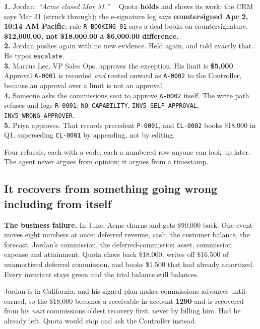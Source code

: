 \documentclass[10pt,a4paper]{article}
\newcommand{\gy}[1]{{\color{qgrey}#1}}
\newcommand{\code}[1]{{\small\texttt{#1}}}
\begin{document}
\begin{callout}
\small
\textbf{1.} Jordan: \emph{``Acme closed Mar 31.''} \ \ Quota \textbf{holds} and shows its work: the CRM says Mar 31 \gy{(struck through)}; the e-signature log says \textbf{countersigned Apr 2, 10:14 AM Pacific}; rule \code{R-BOOKING-01} says a deal books on countersignature. \textbf{\$12{,}000.00, not \$18{,}000.00 \textemdash{} a \$6{,}000.00 difference.}\\[4pt]
\textbf{2.} Jordan pushes again with no new evidence. Held again, and told exactly that. He types \code{escalate}.\\[4pt]
\textbf{3.} Marcus Lee, VP Sales Ops, approves the exception. His limit is \textbf{\$5{,}000}. Approval \code{A-0001} is recorded \emph{and} routed onward as \code{A-0002} to the Controller, because an approval over a limit is not an approval.\\[4pt]
\textbf{4.} Someone asks the commissions seat to approve \code{A-0002} itself. The write path refuses and logs \code{R-0001}: \code{NO\_CAPABILITY}, \code{INV5\_SELF\_APPROVAL}, \code{INV5\_WRONG\_APPROVER}.\\[4pt]
\textbf{5.} Priya approves. That records precedent \code{P-0001}, and \code{CL-0002} books \$18{,}000 in Q1, superseding \code{CL-0001} \textemdash{} by appending, not by editing.
\end{callout}

Four refusals, each with a code, each a numbered row anyone can look up later. The agent never argues from opinion; it argues from a timestamp.

\subsection{It recovers from something going wrong \textemdash{} including from itself}

\textbf{The business failure.} In June, Acme churns and gets \$90{,}000 back. One event moves eight numbers at once: deferred revenue, cash, the customer balance, the forecast, Jordan's commission, the deferred-commission asset, commission expense and attainment. Quota claws back \$18{,}000, writes off \$16{,}500 of unamortized deferred commission, and books \$1{,}500 that had already amortized. Every invariant stays green and the trial balance still balances.

Jordan is in California, and his signed plan makes commissions advances until earned, so the \$18{,}000 becomes a receivable in account \textbf{1290} and is recovered from his \emph{next} commissions \textemdash{} oldest recovery first, never by billing him. Had he already left, Quota would stop and ask the Controller instead.
\end{document}
